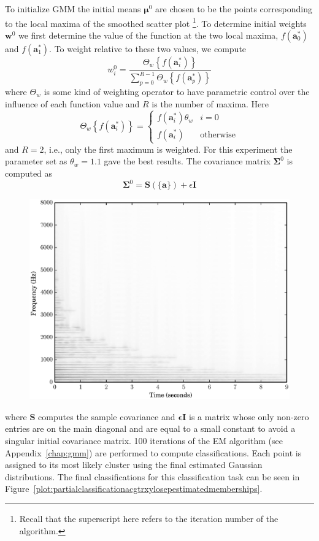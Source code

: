 To initialize GMM the initial means $\boldsymbol{\mu}^{0}$ are chosen to be the
points corresponding to the local maxima of the smoothed scatter plot%
\footnote{Recall that the superscript here refers to the iteration number of the
algorithm.}. To
determine initial weights $\boldsymbol{w}^{0}$ we first determine the value of
the function at the two local maxima, $f(\boldsymbol{a}_{0}^{\ast})$ and
$f(\boldsymbol{a}_{1}^{\ast})$. To weight relative to these two values, we
compute
\[
    w_{i}^{0} = \frac{\Theta_{w} \left\{ f(\boldsymbol{a}_{i}^{\ast}) \right\}}{
    \sum_{p=0}^{R-1}\Theta_{w} \left\{ f(\boldsymbol{a}_{p}^{\ast}) \right\}}
\]
where $\Theta_{w}$ is some kind of weighting operator to have parametric control
over the influence of each function value and $R$ is the number of maxima. Here
\[
    \Theta_{w} \left\{ f(\boldsymbol{a}_{i}^{\ast}) \right\}
    = \begin{cases}
        f(\boldsymbol{a}_{i}^{\ast}) \theta_{w} & i = 0 \\
        f(\boldsymbol{a}_{i}^{\ast}) & \text{otherwise}
    \end{cases}
\]
and $R = 2$, i.e., only the first maximum is weighted. For this experiment the parameter set as $\theta_{w} = 1.1$ gave
the best results. The covariance matrix $\boldsymbol{\Sigma}^{0}$ is computed as
\[
    \boldsymbol{\Sigma}^{0} = \boldsymbol{S}(\{ \boldsymbol{a} \}) +
    \epsilon\boldsymbol{I}
\]
\begin{figure}[t]
    \centering
    \includegraphics[width=\figwidthscale\textwidth]{plots/ac_gtr_ss_spec.eps}
\end{figure}%
where $\boldsymbol{S}$ computes the sample covariance and
$\boldsymbol{\epsilon}\boldsymbol{I}$ is a matrix whose only non-zero entries
are on the main diagonal and are equal to a small constant to avoid a singular
initial covariance matrix. 100 iterations of the EM algorithm (see
Appendix~\ref{chap:gmm}) are performed to compute classifications. Each point is assigned
to its most likely cluster using the final estimated Gaussian distributions. The
final classifications for this classification task can be seen in
Figure~\ref{plot:partialclassificationacgtrxylosepestimatedmemberships}.

